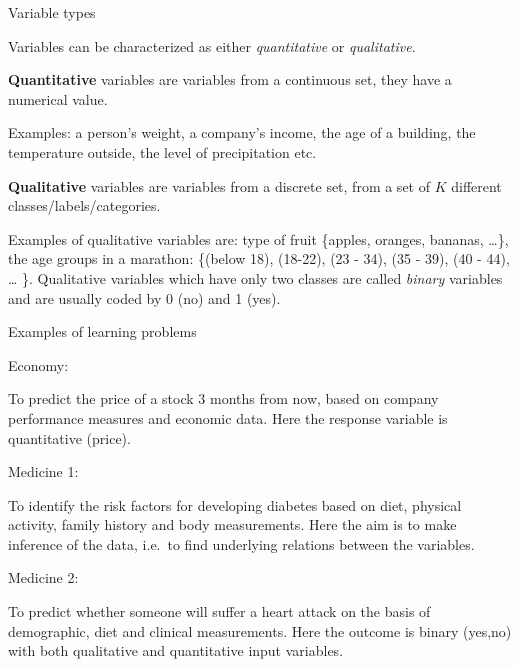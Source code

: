 \documentclass[ignorenonframetext,]{beamer}
\begin{document}
\begin{frame}

\begin{block}{Variable types}

Variables can be characterized as either \emph{quantitative} or
\emph{qualitative}.

\textbf{Quantitative} variables are variables from a continuous set,
they have a numerical value.

Examples: a person's weight, a company's income, the age of a building,
the temperature outside, the level of precipitation etc.

\textbf{Qualitative} variables are variables from a discrete set, from a
set of \(K\) different classes/labels/categories.

Examples of qualitative variables are: type of fruit \{apples, oranges,
bananas, \ldots{}\}, the age groups in a marathon: \{(below 18),
(18-22), (23 - 34), (35 - 39), (40 - 44), \ldots{} \}. Qualitative
variables which have only two classes are called \emph{binary} variables
and are usually coded by 0 (no) and 1 (yes).

\end{block}

\end{frame}

\begin{frame}

\begin{block}{Examples of learning problems}

\begin{block}{Economy:}

To predict the price of a stock 3 months from now, based on company
performance measures and economic data. Here the response variable is
quantitative (price).

\end{block}

\begin{block}{Medicine 1:}

To identify the risk factors for developing diabetes based on diet,
physical activity, family history and body measurements. Here the aim is
to make inference of the data, i.e.~to find underlying relations between
the variables.

\end{block}

\begin{block}{Medicine 2:}

To predict whether someone will suffer a heart attack on the basis of
demographic, diet and clinical measurements. Here the outcome is binary
({yes},{no}) with both qualitative and quantitative input variables.

\end{block}

\end{block}

\end{frame}
\end{document}
